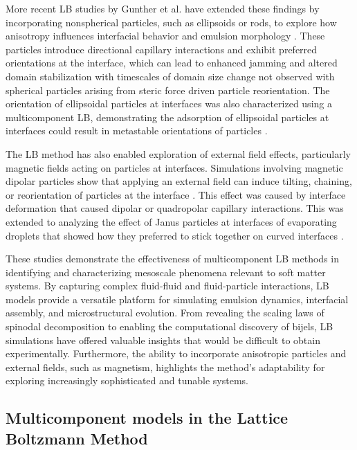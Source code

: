 More recent LB studies by Gunther et al. have extended these findings by incorporating nonspherical particles, such as ellipsoids or rods, to explore how anisotropy influences interfacial behavior 
and emulsion morphology \cite{gunther_timescales_2014}. These particles introduce directional capillary interactions and exhibit preferred orientations at the interface, which can lead to enhanced 
jamming and altered domain stabilization with timescales of domain size change not observed with spherical particles arising from steric force driven particle reorientation. The orientation of 
ellipsoidal particles at interfaces was also characterized using a multicomponent LB, demonstrating the adsorption of ellipsoidal particles at interfaces could result in metastable orientations of 
particles \cite{gunther_lattice_2013}.

The LB method has also enabled exploration of external field effects, particularly magnetic fields acting on particles at interfaces. Simulations involving magnetic dipolar particles show that 
applying an external field can induce tilting, chaining, or reorientation of particles at the interface \cite{davies_interface_2014, davies_assembling_2014}. This effect was caused by interface 
deformation that caused dipolar or quadropolar capillary interactions. This was extended to analyzing the effect of Janus particles at interfaces of evaporating droplets that showed how they preferred 
to stick together on curved interfaces \cite{xie_direct_2017}.

These studies demonstrate the effectiveness of multicomponent LB methods in identifying and characterizing mesoscale phenomena relevant to soft matter systems. By capturing 
complex fluid-fluid and fluid-particle interactions, LB models provide a versatile platform for simulating emulsion dynamics, interfacial assembly, and 
microstructural evolution. From revealing the scaling laws of spinodal decomposition to enabling the computational discovery of bijels, LB simulations have offered valuable insights that would be 
difficult to obtain experimentally. Furthermore, the ability to incorporate anisotropic particles and external fields, such as magnetism, highlights the method's adaptability for exploring 
increasingly sophisticated and tunable systems. 

\subsection{Multicomponent models in the Lattice Boltzmann Method}

